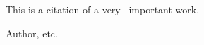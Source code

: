 \documentclass[final,letterpaper,twoside,12pt]{article}
\begin{document}
This is a citation of a very~{\cite{c:dummy}} important work.

\begin{thebibliography}{99}
 Author, etc.
\end{thebibliography}
\end{document}
